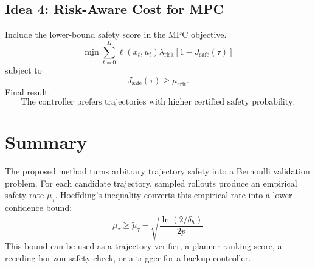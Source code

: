 \documentclass[11pt]{article}
\begin{document}
\subsection*{Idea 4: Risk-Aware Cost for MPC}

Include the lower-bound safety score in the MPC objective.
\[
\min_{\tau}
\sum_{t=0}^{H}
\ell(x_t,u_t)
\lambda_{\mathrm{risk}}
\left[
1-J_{\mathrm{safe}}(\tau)
\right]
\]
subject to
\[
J_{\mathrm{safe}}(\tau)\ge\mu_{\mathrm{crit}}.
\]
Final result.
\[
\boxed{
\text{The controller prefers trajectories with higher certified safety probability.}
}
\]

\section*{Summary}

The proposed method turns arbitrary trajectory safety into a Bernoulli validation problem.
For each candidate trajectory, sampled rollouts produce an empirical safety rate \(\tilde\mu_\tau\).
Hoeffding's inequality converts this empirical rate into a lower confidence bound:
\[
\boxed{
\mu_\tau
\ge
\tilde\mu_\tau
-
\sqrt{
\frac{\ln(2/\delta_h)}{2p}
}
}
\]
This bound can be used as a trajectory verifier, a planner ranking score, a receding-horizon safety check, or a trigger for a backup controller.
\end{document}
